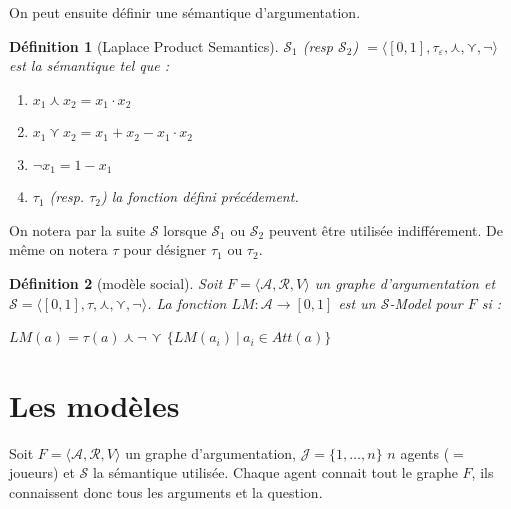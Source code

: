 \documentclass[12pt]{article}
\theoremstyle{defi}
\newtheorem{definition}{Définition}[section]
\theoremstyle{not}
\theoremstyle{prob}
\begin{document}
      On peut ensuite définir une sémantique d'argumentation.
      \begin{definition}[Laplace Product Semantics]
        $\mathcal{S}_1$ (resp $\mathcal{S}_2$) $= \langle [0, 1], \tau_\varepsilon, \curlywedge, \curlyvee, \neg  \rangle$ est la sémantique tel que :
        \begin{enumerate}
          \item $x_1 \curlywedge x_2 = x_1 \cdot x_2$
          \item $x_1 \curlyvee x_2 = x_1 + x_2 - x_1 \cdot x_2$
          \item $\neg x_1 = 1 - x_1$
          \item $\tau_1$ (resp. $\tau_2$) la fonction défini précédement.
        \end{enumerate}
      \end{definition}

      On notera par la suite $\mathcal{S}$ lorsque $\mathcal{S}_1$ ou $\mathcal{S}_2$ peuvent être utilisée indifférement.
      De même on notera $\tau$ pour désigner $\tau_1$ ou $\tau_2$.

      \begin{definition}[modèle social]
        Soit $F= \langle \mathcal{A}, \mathcal{R}, V \rangle$ un graphe d'argumentation et $\mathcal{S} = \langle [0, 1], \tau, \curlywedge, \curlyvee, \neg  \rangle$.
        La fonction $LM : \mathcal{A} \rightarrow [0, 1]$ est un $\mathcal{S}$-Model pour $F$ si :

        $LM(a) = \tau(a) \curlywedge \neg$ {\Large $\curlyvee$} $\{LM(a_i)\ |\ a_i \in Att(a)\}$
      \end{definition}

  \section{Les modèles}
    Soit $F = \langle \mathcal{A}, \mathcal{R}, V \rangle$ un graphe d'argumentation, $\mathcal{J} = \{1, \ldots, n\}$ $n$ agents ($=$ joueurs) et $\mathcal{S}$ la sémantique utilisée.
    Chaque agent connait tout le graphe $F$, ils connaissent donc tous les arguments et la question.
\end{document}

